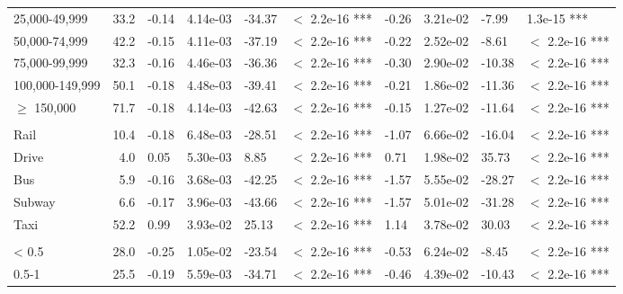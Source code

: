 \documentclass{article}\usepackage[utf8]{inputenc}
\begin{document}
\begin{table}[H]
\begin{tabular}{lrllllllll}
\hspace{1em}25,000-49,999 & 33.2 & -0.14 & 4.14e-03 & -34.37 & $<$ 2.2e-16 *** & -0.26 & 3.21e-02 & -7.99 & 1.3e-15 ***\\
\hspace{1em}50,000-74,999 & 42.2 & -0.15 & 4.11e-03 & -37.19 & $<$ 2.2e-16 *** & -0.22 & 2.52e-02 & -8.61 & $<$ 2.2e-16 ***\\
\hspace{1em}75,000-99,999 & 32.3 & -0.16 & 4.46e-03 & -36.36 & $<$ 2.2e-16 *** & -0.30 & 2.90e-02 & -10.38 & $<$ 2.2e-16 ***\\
\hspace{1em}100,000-149,999 & 50.1 & -0.18 & 4.48e-03 & -39.41 & $<$ 2.2e-16 *** & -0.21 & 1.86e-02 & -11.36 & $<$ 2.2e-16 ***\\
\hspace{1em}$\geq$ 150,000 & 71.7 & -0.18 & 4.14e-03 & -42.63 & $<$ 2.2e-16 *** & -0.15 & 1.27e-02 & -11.64 & $<$ 2.2e-16 ***\\
\addlinespace[0.3em]
\multicolumn{10}{l}{\textbf{Mode model, $McFadden~R^2 = 0.65$}}\\
\hline
\hspace{1em}Rail & 10.4 & -0.18 & 6.48e-03 & -28.51 & $<$ 2.2e-16 *** & -1.07 & 6.66e-02 & -16.04 & $<$ 2.2e-16 ***\\
\hspace{1em}Drive & 4.0 & 0.05 & 5.30e-03 & 8.85 & $<$ 2.2e-16 *** & 0.71 & 1.98e-02 & 35.73 & $<$ 2.2e-16 ***\\
\hspace{1em}Bus & 5.9 & -0.16 & 3.68e-03 & -42.25 & $<$ 2.2e-16 *** & -1.57 & 5.55e-02 & -28.27 & $<$ 2.2e-16 ***\\
\hspace{1em}Subway & 6.6 & -0.17 & 3.96e-03 & -43.66 & $<$ 2.2e-16 *** & -1.57 & 5.01e-02 & -31.28 & $<$ 2.2e-16 ***\\
\hspace{1em}Taxi & 52.2 & 0.99 & 3.93e-02 & 25.13 & $<$ 2.2e-16 *** & 1.14 & 3.78e-02 & 30.03 & $<$ 2.2e-16 ***\\
\addlinespace[0.3em]
\multicolumn{10}{l}{\textbf{Travel distance model, $McFadden~R^2 = 0.55$}}\\
\hline
\hspace{1em}< 0.5 & 28.0 & -0.25 & 1.05e-02 & -23.54 & $<$ 2.2e-16 *** & -0.53 & 6.24e-02 & -8.45 & $<$ 2.2e-16 ***\\
\hspace{1em}0.5-1 & 25.5 & -0.19 & 5.59e-03 & -34.71 & $<$ 2.2e-16 *** & -0.46 & 4.39e-02 & -10.43 & $<$ 2.2e-16 ***\\

\end{tabular}
\end{table}
\end{document}

